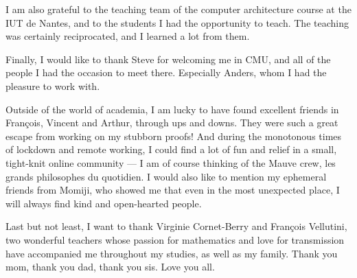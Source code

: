 I am also grateful to the teaching team of the computer architecture course at the 
IUT de Nantes, and to the students I had the opportunity to teach. 
The teaching was certainly reciprocated, and I learned a lot from them. 

Finally, I would like to thank Steve for welcoming me in CMU, and all of the
people I had the occasion to meet there. Especially Anders, whom I had the
pleasure to work with.

Outside of the world of academia, I am lucky to have found excellent friends in
François, Vincent and Arthur, through ups and downs. They were such a great 
escape from working on my stubborn proofs!
% 
And during the monotonous times of lockdown and remote working, I could find a lot 
of fun and relief in a small, tight-knit online community --- I am of course thinking of the 
Mauve crew, les grands philosophes du quotidien.
I would also like to mention my ephemeral friends from Momiji, who showed 
me that even in the most unexpected place, I will always find kind and 
open-hearted people.

Last but not least, I want to thank Virginie Cornet-Berry and 
François Vellutini, two wonderful teachers whose passion for mathematics and love 
for transmission have accompanied me throughout my studies, as well as my family.
Thank you mom, thank you dad, thank you sis. Love you all.